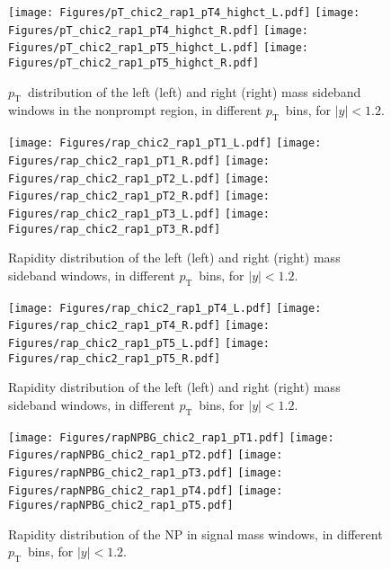 \documentclass[12pt]{article}
\newcommand{\pt}{$p_{\mathrm{T}}$}
\begin{document}
\begin{figure}[htbp]
\centering
\texttt{[image: Figures/pT\_chic2\_rap1\_pT4\_highct\_L.pdf]}
\texttt{[image: Figures/pT\_chic2\_rap1\_pT4\_highct\_R.pdf]}
\texttt{[image: Figures/pT\_chic2\_rap1\_pT5\_highct\_L.pdf]}
\texttt{[image: Figures/pT\_chic2\_rap1\_pT5\_highct\_R.pdf]}
\caption{\pt\ distribution of the left (left) and
  right (right) mass sideband windows in the nonprompt region, in
  different
  \pt\ bins, for $|y| < 1.2$.}
\end{figure}
\clearpage

\begin{figure}[htbp]
\centering
\texttt{[image: Figures/rap\_chic2\_rap1\_pT1\_L.pdf]}
\texttt{[image: Figures/rap\_chic2\_rap1\_pT1\_R.pdf]}
\texttt{[image: Figures/rap\_chic2\_rap1\_pT2\_L.pdf]}
\texttt{[image: Figures/rap\_chic2\_rap1\_pT2\_R.pdf]}
\texttt{[image: Figures/rap\_chic2\_rap1\_pT3\_L.pdf]}
\texttt{[image: Figures/rap\_chic2\_rap1\_pT3\_R.pdf]}
\caption{Rapidity distribution of the left (left) and
  right (right) mass sideband windows, in different
  \pt\ bins, for $|y| < 1.2$.}
\end{figure}
\clearpage

\begin{figure}[htbp]
\centering
\texttt{[image: Figures/rap\_chic2\_rap1\_pT4\_L.pdf]}
\texttt{[image: Figures/rap\_chic2\_rap1\_pT4\_R.pdf]}
\texttt{[image: Figures/rap\_chic2\_rap1\_pT5\_L.pdf]}
\texttt{[image: Figures/rap\_chic2\_rap1\_pT5\_R.pdf]}
\caption{Rapidity distribution of the left (left) and
  right (right) mass sideband windows, in different
  \pt\ bins, for $|y| < 1.2$.}
\end{figure}
\clearpage

\begin{figure}[htbp]
\centering
\texttt{[image: Figures/rapNPBG\_chic2\_rap1\_pT1.pdf]}
\texttt{[image: Figures/rapNPBG\_chic2\_rap1\_pT2.pdf]}
\texttt{[image: Figures/rapNPBG\_chic2\_rap1\_pT3.pdf]}
\texttt{[image: Figures/rapNPBG\_chic2\_rap1\_pT4.pdf]}
\texttt{[image: Figures/rapNPBG\_chic2\_rap1\_pT5.pdf]}
\caption{Rapidity distribution of the NP in signal mass
  windows, in different \pt\ bins, for $|y| < 1.2$.}
\end{figure}
\clearpage
\end{document}
